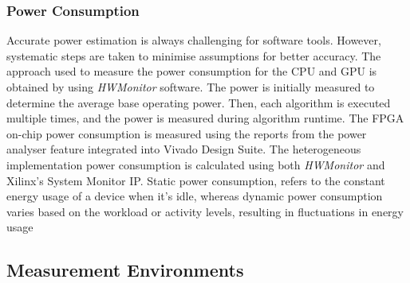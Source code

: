 \subsubsection{Power Consumption}
Accurate power estimation is always challenging for software tools. However, systematic steps are taken to minimise assumptions for better accuracy. The approach used to measure the power consumption for the CPU and GPU is obtained by using \textit{HWMonitor} software. The power is initially measured to determine the average base operating power. Then, each algorithm is executed multiple times, and the power is measured during algorithm runtime. The FPGA on-chip power consumption is measured using the reports from the power analyser feature integrated into Vivado Design Suite. The heterogeneous implementation power consumption is calculated using both \textit{HWMonitor} and Xilinx's System Monitor IP. Static power consumption, refers to the constant energy usage of a device when it's idle, whereas dynamic power consumption varies based on the workload or activity levels, resulting in fluctuations in energy usage



\subsection{Measurement Environments}


